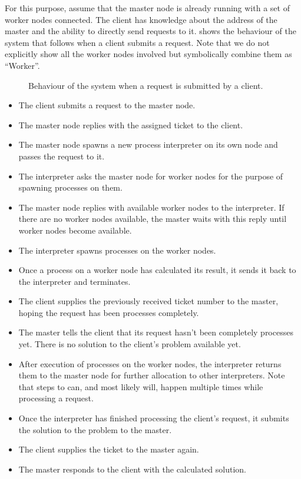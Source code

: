 For this purpose, assume that the master node is already running with a set of worker nodes connected. The client has knowledge about the address of the master and the ability to directly send requests to it.  shows the behaviour of the system that follows when a client submits a request. Note that we do not explicitly show all the worker nodes involved but symbolically combine them as \enquote{Worker}.

\begin{figure}[h!]
  \centering
  
  \caption{Behaviour of the system when a request is submitted by a client.}
  \label{fig:request_handling}
\end{figure}

\begin{itemize}
  \item [\figannotation{1}] The client submits a request to the master node.
  \item [\figannotation{2}] The master node replies with the assigned ticket to the client.
  \item [\figannotation{3}] The master node spawns a new process interpreter on its own node and passes the request to it.
  \item [\figannotation{4}] The interpreter asks the master node for worker nodes for the purpose of spawning processes on them.
  \item [\figannotation{5}] The master node replies with available worker nodes to the interpreter. If there are no worker nodes available, the master waits with this reply until worker nodes become available.
  \item [\figannotation{6}] The interpreter spawns processes on the worker nodes.
  \item [\figannotation{7}] Once a process on a worker node has calculated its result, it sends it back to the interpreter and terminates.
  \item [\figannotation{8}] The client supplies the previously received ticket number to the master, hoping the request has been processes completely.
  \item [\figannotation{9}] The master tells the client that its request hasn't been completely processes yet. There is no solution to the client's problem available yet.
  \item [\figannotation{10}] After execution of processes on the worker nodes, the interpreter returns them to the master node for further allocation to other interpreters. Note that steps  to  can, and most likely will, happen multiple times while processing a request.
  \item [\figannotation{11}] Once the interpreter has finished processing the client's request, it submits the solution to the problem to the master.
  \item [\figannotation{12}] The client supplies the ticket to the master again.
  \item [\figannotation{13}] The master responds to the client with the calculated solution.
\end{itemize}


